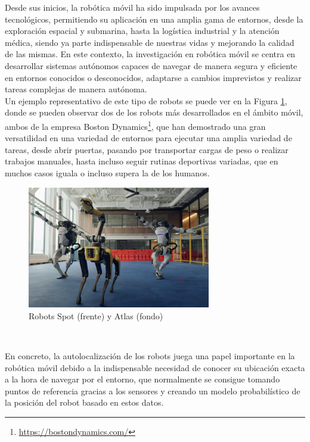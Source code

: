 Desde sus inicios, la robótica móvil ha sido impulsada por los avances
tecnológicos, permitiendo su aplicación en una amplia gama de entornos, desde la
exploración espacial y submarina, hasta la logística industrial y la atención
médica, siendo ya parte indispensable de nuestras vidas y mejorando la calidad
de las mismas.
En este contexto, la investigación en robótica móvil se centra en desarrollar
sistemas autónomos capaces de navegar de manera segura y eficiente en entornos
conocidos o desconocidos, adaptarse a cambios imprevistos y realizar tareas
complejas de manera autónoma.
\\

Un ejemplo representativo de este tipo de robots se puede ver en la Figura
\ref{fig:boston_dynamics}, donde se pueden observar dos de los robots más
desarrollados en el ámbito móvil, ambos de la empresa Boston Dynamics\footnote{
\href{https://bostondynamics.com/}{https://bostondynamics.com/}}, que han
demostrado una gran versatilidad en una variedad de entornos para ejecutar una
amplia variedad de tareas, desde abrir puertas, pasando por transportar cargas
de peso o realizar trabajos manuales, hasta incluso seguir rutinas deportivas
variadas, que en muchos casos iguala o incluso supera la de los humanos.

\begin{figure} [h!]
  \begin{center}
    \includegraphics[width=8cm]{figs/atlas_spot_robots}
  \end{center}
  \caption{Robots Spot (frente) y Atlas (fondo) \cite{atlas_spot}}
  \label{fig:boston_dynamics}
\end{figure}\

En concreto, la autolocalización de los robots juega una papel importante en la
robótica móvil debido a la indispensable necesidad de conocer su ubicación
exacta a la hora de navegar por el entorno, que normalmente se consigue tomando
puntos de referencia gracias a los sensores y creando un modelo probabilístico
de la posición del robot basado en estos datos.
\\

